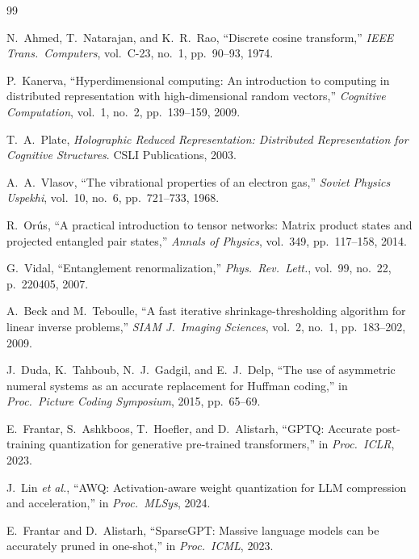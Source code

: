 \documentclass[11pt,a4paper,twocolumn]{article}
\begin{document}
\begin{thebibliography}{99}

	N.~Ahmed, T.~Natarajan, and K.~R.~Rao, ``Discrete cosine transform,''
	\emph{IEEE Trans.\ Computers}, vol.~C-23, no.~1, pp.~90--93, 1974.

	P.~Kanerva, ``Hyperdimensional computing: An introduction to computing in
	distributed representation with high-dimensional random vectors,''
	\emph{Cognitive Computation}, vol.~1, no.~2, pp.~139--159, 2009.

	T.~A.~Plate, \emph{Holographic Reduced Representation: Distributed
		Representation for Cognitive Structures}. CSLI Publications, 2003.

	A.~A.~Vlasov, ``The vibrational properties of an electron gas,''
	\emph{Soviet Physics Uspekhi}, vol.~10, no.~6, pp.~721--733, 1968.

	R.~Orús, ``A practical introduction to tensor networks: Matrix product
	states and projected entangled pair states,''
	\emph{Annals of Physics}, vol.~349, pp.~117--158, 2014.

	G.~Vidal, ``Entanglement renormalization,''
	\emph{Phys.\ Rev.\ Lett.}, vol.~99, no.~22, p.~220405, 2007.

	A.~Beck and M.~Teboulle, ``A fast iterative shrinkage-thresholding
	algorithm for linear inverse problems,''
	\emph{SIAM J.\ Imaging Sciences}, vol.~2, no.~1, pp.~183--202, 2009.

	J.~Duda, K.~Tahboub, N.~J.~Gadgil, and E.~J.~Delp, ``The use of asymmetric
	numeral systems as an accurate replacement for Huffman coding,''
	in \emph{Proc.\ Picture Coding Symposium}, 2015, pp.~65--69.

	E.~Frantar, S.~Ashkboos, T.~Hoefler, and D.~Alistarh, ``GPTQ: Accurate
	post-training quantization for generative pre-trained transformers,''
	in \emph{Proc.\ ICLR}, 2023.

	J.~Lin \emph{et al.}, ``AWQ: Activation-aware weight quantization for LLM
	compression and acceleration,''
	in \emph{Proc.\ MLSys}, 2024.

	E.~Frantar and D.~Alistarh, ``SparseGPT: Massive language models can be
	accurately pruned in one-shot,''
	in \emph{Proc.\ ICML}, 2023.


\end{thebibliography}
\end{document}
